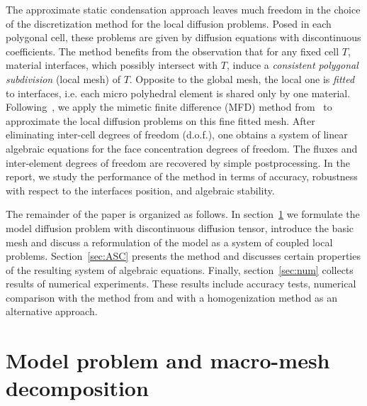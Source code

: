 \documentclass[12pt]{article}
\begin{document}
The approximate static condensation approach leaves much freedom in the choice of the discretization method for the local diffusion problems.  Posed in each polygonal cell, these problems are given by  diffusion equations with  discontinuous coefficients. The method benefits from the observation that   for any fixed cell $T$,  material interfaces, which possibly intersect with $T$,  induce a \emph{consistent polygonal subdivision} (local mesh) of $T$. Opposite to the global mesh, the local one is \emph{fitted} to interfaces, i.e. each micro polyhedral element is shared only by one material. Following~\cite{kikinzon2017approximate}, we apply the mimetic finite difference (MFD) method from~\cite{lipnikov2014mimetic} to approximate the local diffusion problems on this fine fitted mesh.
After eliminating inter-cell degrees of freedom (d.o.f.), one obtains a system of linear algebraic equations for the face concentration degrees of freedom. The fluxes and inter-element degrees of freedom are recovered by simple postprocessing. In the report, we study the performance of the method in terms of accuracy, robustness with respect to the interfaces position,  and algebraic stability.

The remainder of the paper is organized as follows. In section~\ref{sec:model} we formulate the model diffusion problem with discontinuous diffusion tensor, introduce the basic mesh and discuss a reformulation of the model as a system of coupled local problems. Section~\ref{sec:ASC} presents the method and discusses certain  properties of the resulting  system of algebraic equations. Finally, section~\ref{sec:num} collects results of numerical experiments. These results include accuracy tests, numerical comparison with the method from  \cite{kikinzon2017approximate} and with a homogenization method as an alternative approach.

\section{Model problem and macro-mesh decomposition} \label{sec:model}
\end{document}
